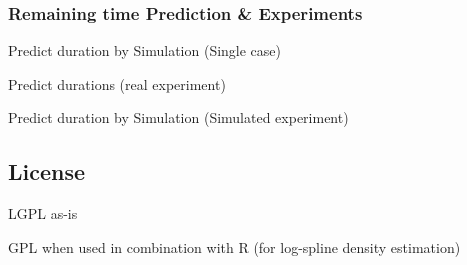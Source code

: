 \subsubsection{Remaining time Prediction \& Experiments}
\begin{compactitem}
  \item Predict duration by Simulation (Single case)
  \item Predict durations (real experiment)
  \item Predict duration by Simulation (Simulated experiment)
\end{compactitem}

\subsection*{License}
\begin{compactitem}
  \item LGPL as-is
  \item GPL when used in combination with R (for log-spline density estimation)
\end{compactitem} 

